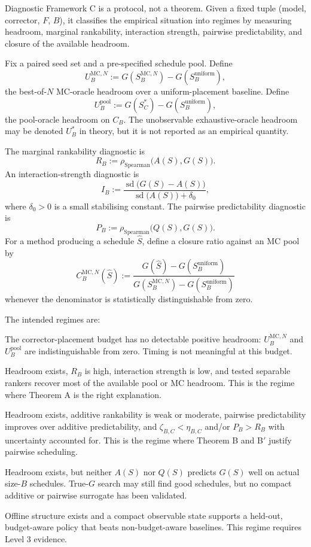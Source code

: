 Diagnostic Framework C is a protocol, not a theorem. Given a fixed tuple
(model, corrector, $F$, $B$), it classifies the empirical situation into
regimes by measuring headroom, marginal rankability, interaction strength,
pairwise predictability, and closure of the available headroom.

Fix a paired seed set and a pre-specified schedule pool. Define
\[
  U_B^{\mathrm{MC},N}
  :=
  G(S_B^{\mathrm{MC},N})-G(S_B^{\mathrm{uniform}}),
\]
the best-of-$N$ MC-oracle headroom over a uniform-placement baseline. Define
\[
  U_B^{\mathrm{pool}}
  :=
  G(S_C^*)-G(S_B^{\mathrm{uniform}}),
\]
the pool-oracle headroom on $C_B$. The unobservable exhaustive-oracle headroom
may be denoted $U_B^*$ in theory, but it is not reported as an empirical
quantity.

The marginal rankability diagnostic is
\[
  R_B := \rho_{\mathrm{Spearman}}\bigl(A(S),G(S)\bigr).
\]
An interaction-strength diagnostic is
\[
  I_B :=
  \frac{
    \operatorname{sd}\bigl(G(S)-A(S)\bigr)
  }{
    \operatorname{sd}\bigl(A(S)\bigr)+\delta_0
  },
\]
where $\delta_0>0$ is a small stabilising constant. The pairwise
predictability diagnostic is
\[
  P_B := \rho_{\mathrm{Spearman}}\bigl(Q(S),G(S)\bigr).
\]
For a method producing a schedule $\widehat S$, define a closure ratio against
an MC pool by
\[
  C_B^{\mathrm{MC},N}(\widehat S)
  :=
  \frac{G(\widehat S)-G(S_B^{\mathrm{uniform}})}
       {G(S_B^{\mathrm{MC},N})-G(S_B^{\mathrm{uniform}})}
\]
whenever the denominator is statistically distinguishable from zero.

The intended regimes are:
\begin{description}[leftmargin=2.5cm,style=nextline]
  \item[No-op.]
  The corrector-placement budget has no detectable positive headroom:
  $U_B^{\mathrm{MC},N}$ and $U_B^{\mathrm{pool}}$ are indistinguishable from
  zero. Timing is not meaningful at this budget.

  \item[Marginal/rankable.]
  Headroom exists, $R_B$ is high, interaction strength is low, and tested
  separable rankers recover most of the available pool or MC headroom. This is
  the regime where Theorem A is the right explanation.

  \item[Interaction-driven.]
  Headroom exists, additive rankability is weak or moderate, pairwise
  predictability improves over additive predictability, and
  $\zeta_{B,C}<\eta_{B,C}$ and/or $P_B>R_B$ with uncertainty accounted for.
  This is the regime where Theorem B and B$'$ justify pairwise scheduling.

  \item[Higher-order/chaotic.]
  Headroom exists, but neither $A(S)$ nor $Q(S)$ predicts $G(S)$ well on
  actual size-$B$ schedules. True-$G$ search may still find good schedules, but
  no compact additive or pairwise surrogate has been validated.

  \item[Online-decision-like.]
  Offline structure exists and a compact observable state supports a
  held-out, budget-aware policy that beats non-budget-aware baselines. This
  regime requires Level 3 evidence.
\end{description}

